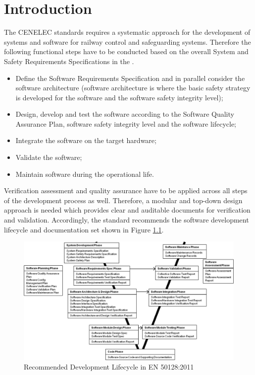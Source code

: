 \documentclass{./template/openetcs_report}
\begin{document}
\mainmatter

\chapter{Introduction}

The CENELEC standards requires a systematic approach for the development of systems and software for railway control and safeguarding systems. Therefore the following functional steps have to be conducted based on the overall System and Safety Requirements Specifications in the \citeauthor{EN50128:2011}.

\vspace{-10pt}
\begin{itemize} [topsep=2pt, partopsep=2pt,itemsep=2pt,parsep=2pt]
  \item  Define the Software Requirements Specification and in parallel consider the software architecture (software architecture is where the basic safety strategy is developed for the software and the software safety integrity level); 
  \item Design, develop and test the software according to the Software Quality Assurance Plan, software safety integrity level and the software lifecycle;
  \item Integrate the software on the target hardware;
  \item Validate the software;
  \item Maintain software during the operational life. 
\end{itemize}

Verification assessment and quality assurance have to be applied across all steps of the development process as well. Therefore, a modular and top-down design approach is needed which provides clear and auditable documents for verification and validation. Accordingly, the standard recommends the  software development lifecycle  and documentation set shown in Figure \ref{fig:Development-lifecycle-EN50128}.

\begin{figure}[h]
\centering
\includegraphics[scale=0.6]{Development-lifecycle-EN50128-own.png}
\caption{Recommended Development Lifecycle in EN 50128:2011}
\label{fig:Development-lifecycle-EN50128}
\end{figure}
\end{document}
